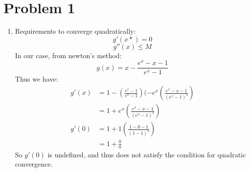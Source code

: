 \documentclass{article}
\title{\thetitle}
\author{\theauthor}
\begin{document}
\maketitle
\section*{Problem 1}
\begin{enumerate}[label=\alph*.)]
\item 
Requirements to converge quadratically: \\
\[
g'(x*) = 0
\]
\[
g''(x) \leq M
\]
In our case, from newton's method: \\
\[
g(x) = x - \frac{e^x - x - 1}{e^x - 1}
\]
Thus we have:
\begin{align*}
g'(x) &= 1 - (\frac{e^x - 1}{e^x-1})(-e^x(\frac{e^x - x - 1}{(e^x - 1)^2}) \\
&= 1 + e^x(\frac{e^x - x - 1}{(e^x - 1)^2}) \\
g'(0) &= 1 + 1(\frac{1 - 0 - 1}{(1 - 1)^2}) \\
&= 1 + \frac{0}{0} 
\end{align*}
So $g'(0)$ is undefined, and thus does not satisfy the condition for quadratic convergence.
\end{enumerate}
\end{document}
